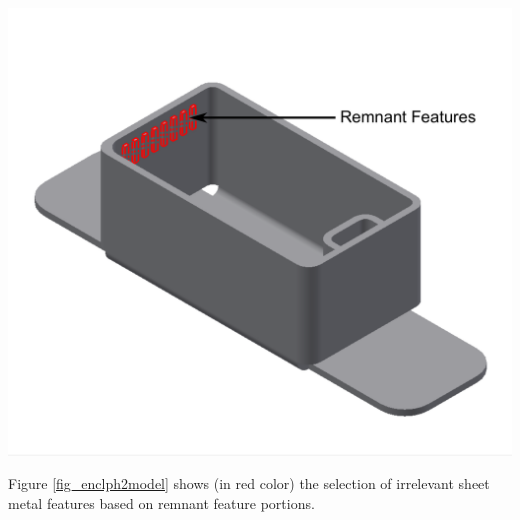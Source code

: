 
\begin{minipage}{\linewidth}
\begin{minipage}[c]{0.62\linewidth}
\includegraphics[width=\linewidth,valign=t]{../Common/images/SheetMetal_Medium_Enclosure_PhaseIISelections_2}

 \label{fig_enclph2model}

\bigskip

Figure \ref{fig_enclph2model} shows (in red color) the selection of irrelevant sheet metal features based on remnant feature portions.%


\end{minipage}
\end{minipage}

